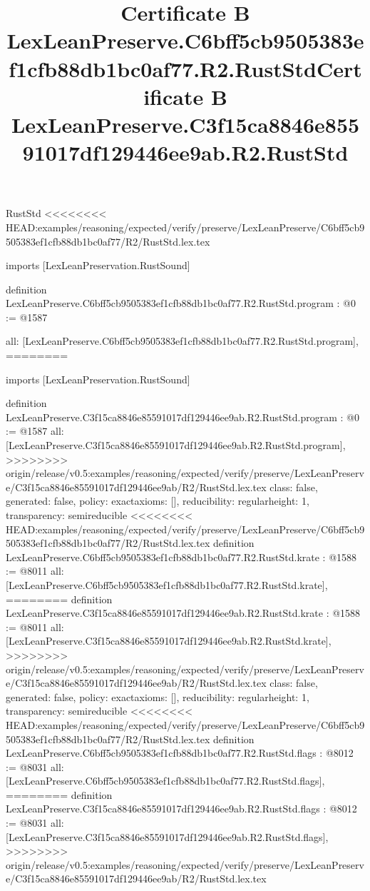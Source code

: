 \begin{lexlean}{RustStd}
<<<<<<<< HEAD:examples/reasoning/expected/verify/preserve/LexLeanPreserve/C6bff5cb9505383ef1cfb88db1bc0af77/R2/RustStd.lex.tex
\title{Certificate B LexLeanPreserve.C6bff5cb9505383ef1cfb88db1bc0af77.R2.RustStd}
\begin{coremodule}
imports [LexLeanPreservation.RustSound]

definition LexLeanPreserve.C6bff5cb9505383ef1cfb88db1bc0af77.R2.RustStd.program : @0 := @1587 {
  all: [LexLeanPreserve.C6bff5cb9505383ef1cfb88db1bc0af77.R2.RustStd.program],
========
\title{Certificate B LexLeanPreserve.C3f15ca8846e85591017df129446ee9ab.R2.RustStd}
\begin{coremodule}
imports [LexLeanPreservation.RustSound]

definition LexLeanPreserve.C3f15ca8846e85591017df129446ee9ab.R2.RustStd.program : @0 := @1587 {
  all: [LexLeanPreserve.C3f15ca8846e85591017df129446ee9ab.R2.RustStd.program],
>>>>>>>> origin/release/v0.5:examples/reasoning/expected/verify/preserve/LexLeanPreserve/C3f15ca8846e85591017df129446ee9ab/R2/RustStd.lex.tex
  class: false,
  generated: false,
  policy: exact{axioms: []},
  reducibility: regular{height: 1},
  transparency: semireducible
}
<<<<<<<< HEAD:examples/reasoning/expected/verify/preserve/LexLeanPreserve/C6bff5cb9505383ef1cfb88db1bc0af77/R2/RustStd.lex.tex
definition LexLeanPreserve.C6bff5cb9505383ef1cfb88db1bc0af77.R2.RustStd.krate : @1588 := @8011 {
  all: [LexLeanPreserve.C6bff5cb9505383ef1cfb88db1bc0af77.R2.RustStd.krate],
========
definition LexLeanPreserve.C3f15ca8846e85591017df129446ee9ab.R2.RustStd.krate : @1588 := @8011 {
  all: [LexLeanPreserve.C3f15ca8846e85591017df129446ee9ab.R2.RustStd.krate],
>>>>>>>> origin/release/v0.5:examples/reasoning/expected/verify/preserve/LexLeanPreserve/C3f15ca8846e85591017df129446ee9ab/R2/RustStd.lex.tex
  class: false,
  generated: false,
  policy: exact{axioms: []},
  reducibility: regular{height: 1},
  transparency: semireducible
}
<<<<<<<< HEAD:examples/reasoning/expected/verify/preserve/LexLeanPreserve/C6bff5cb9505383ef1cfb88db1bc0af77/R2/RustStd.lex.tex
definition LexLeanPreserve.C6bff5cb9505383ef1cfb88db1bc0af77.R2.RustStd.flags : @8012 := @8031 {
  all: [LexLeanPreserve.C6bff5cb9505383ef1cfb88db1bc0af77.R2.RustStd.flags],
========
definition LexLeanPreserve.C3f15ca8846e85591017df129446ee9ab.R2.RustStd.flags : @8012 := @8031 {
  all: [LexLeanPreserve.C3f15ca8846e85591017df129446ee9ab.R2.RustStd.flags],
>>>>>>>> origin/release/v0.5:examples/reasoning/expected/verify/preserve/LexLeanPreserve/C3f15ca8846e85591017df129446ee9ab/R2/RustStd.lex.tex
}}}
\end{coremodule}}
\end{coremodule}
\end{lexlean}
